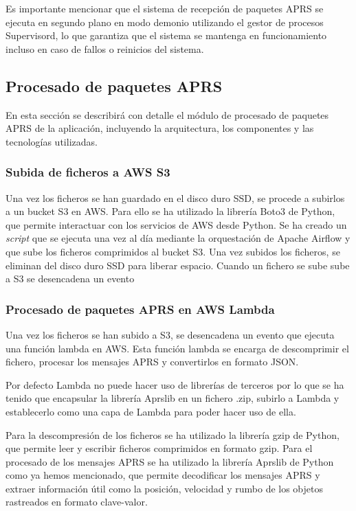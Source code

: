 Es importante mencionar que el sistema de recepción de paquetes APRS se ejecuta en segundo plano en modo demonio utilizando el gestor de procesos Supervisord, lo que garantiza que el sistema se mantenga en funcionamiento incluso en caso de fallos o reinicios del sistema.

\subsection{Procesado de paquetes APRS}
En esta sección se describirá con detalle el módulo de procesado de paquetes APRS de la aplicación, incluyendo la arquitectura, los componentes y las tecnologías utilizadas.

\subsubsection*{Subida de ficheros a AWS S3}

Una vez los ficheros se han guardado en el disco duro SSD, se procede a subirlos a un bucket S3 en AWS. Para ello se ha utilizado la librería Boto3 de Python, que permite interactuar con los servicios de AWS desde Python. Se ha creado un \textit{script} que se ejecuta una vez al día mediante la orquestación de Apache Airflow y que sube los ficheros comprimidos al bucket S3. Una vez subidos los ficheros, se eliminan del disco duro SSD para liberar espacio. Cuando un fichero se sube sube a S3 se desencadena un evento

\subsubsection*{Procesado de paquetes APRS en AWS Lambda}

Una vez los ficheros se han subido a S3, se desencadena un evento que ejecuta una función lambda  en AWS. Esta función lambda se encarga de descomprimir el fichero, procesar los mensajes APRS y convertirlos en formato JSON.

Por defecto Lambda no puede hacer uso de librerías de terceros por lo que se ha tenido que encapsular la librería Aprslib en un fichero .zip, subirlo a Lambda y establecerlo como una capa de Lambda para poder hacer uso de ella.

Para la descompresión de los ficheros se ha utilizado la librería gzip de Python, que permite leer y escribir ficheros comprimidos en formato gzip.
Para el procesado de los mensajes APRS se ha utilizado la librería Aprslib de Python como ya hemos mencionado, que permite decodificar los mensajes APRS y extraer información útil como la posición, velocidad y rumbo de los objetos rastreados en formato clave-valor.



